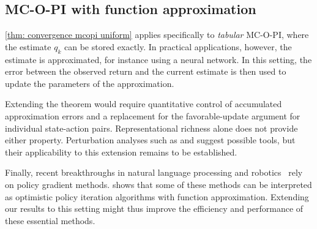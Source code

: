 \subsection{MC-O-PI with function approximation}
\label{sec: discussion function approximation}

\autoref{thm: convergence mcopi uniform} applies specifically to \textit{tabular} MC-O-PI, where the estimate $q_k$ can be stored exactly.
In practical applications, however, the estimate is approximated, for instance using a neural network.
In this setting, the error between the observed return and the current estimate is then used to update the parameters of the approximation.


Extending the theorem would require quantitative control of accumulated approximation errors and a replacement for the favorable-update argument for individual state-action pairs. Representational richness alone does not provide either property. Perturbation analyses such as \citet[Section~4.3.3]{Bertsekas1996Neuro-DynamicProgramming} and \citet[Section~5.2]{Kushner2003StochasticApplications} suggest possible tools, but their applicability to this extension remains to be established.








Finally, recent breakthroughs in natural language processing and robotics~\citep{Schulman2017ProximalAlgorithms} rely on policy gradient methods.
\citet{Wagner2013OptimisticResult} shows that some of these methods can be interpreted as optimistic policy iteration algorithms with function approximation.
Extending our results to this setting might thus improve the efficiency and performance of these essential methods.























































